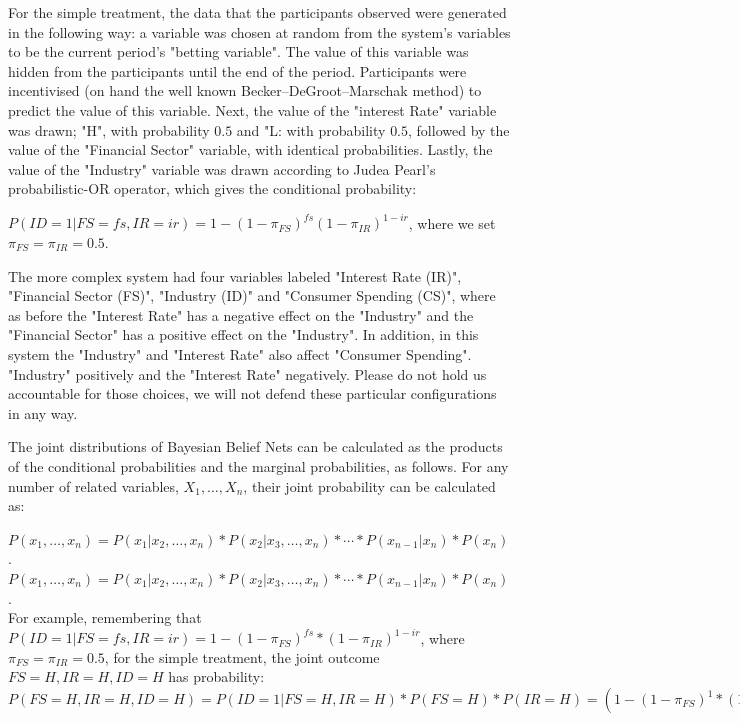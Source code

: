 For the simple treatment, the data that the participants observed were generated in the following way: a variable was chosen at random from the system's variables to be the current period's "betting variable". The value of this variable was hidden from the participants until the end of the period. Participants were incentivised (on hand the well known Becker–DeGroot–Marschak method) to predict the value of this variable. Next, the value of the "interest Rate" variable was drawn; "H", with probability $0.5$ and "L: with probability $0.5$, followed by the value of the "Financial Sector" variable, with identical probabilities. Lastly, the value of the "Industry" variable was drawn according to Judea Pearl's \citep{Pearl88} probabilistic-OR operator, which gives the conditional probability:  

$P(ID=1|FS=fs, IR=ir) = 1-(1-\pi_{FS})^{fs}(1-\pi_{IR})^{1-ir}$, where we set $\pi_{FS}=\pi_{IR}=0.5$. 


The more complex system had four variables labeled "Interest Rate (IR)", "Financial Sector (FS)", "Industry (ID)" and "Consumer Spending (CS)", where as before the "Interest Rate" has a negative effect on the "Industry" and the "Financial Sector" has a positive effect on the "Industry". In addition, in this system the "Industry" and "Interest Rate" also affect "Consumer Spending". "Industry" positively and the "Interest Rate" negatively.  Please do not hold us accountable for those choices, we will not defend these particular configurations in any way.

The joint distributions of Bayesian Belief Nets can be calculated as the products of the conditional probabilities and the marginal probabilities, as follows. For any number of related variables, $X_1, \ldots, X_n$, their joint probability can be calculated as:

$P(x_1, \ldots, x_n) = P(x_1 | x_2, \ldots, x_n)*P(x_2 | x_3, \ldots, x_n)*\cdots*P(x_{n-1} |x_n)*P(x_n)$.
\\

$P(x_1, \ldots, x_n) = P(x_1 | x_2, \ldots, x_n)*P(x_2 | x_3, \ldots, x_n)*\cdots*P(x_{n-1} |x_n)*P(x_n)$.
\\

For example, remembering that $P(ID=1|FS=fs, IR=ir) = 1-(1-\pi_{FS})^{fs}*(1-\pi_{IR})^{1-ir}$, where $\pi_{FS}=\pi_{IR}=0.5$, for the simple treatment, the joint outcome $FS=H, IR=H, ID=H$ has probability:
\\

$P(FS=H, IR=H, ID=H) = P(ID=1|FS=H, IR=H)*P(FS=H)*P(IR=H)=\left(1-(1-\pi_{FS})^{1}*(1-\pi_{IR})^{1-1}\right)*0.5^2 =0.125.$  
\\

